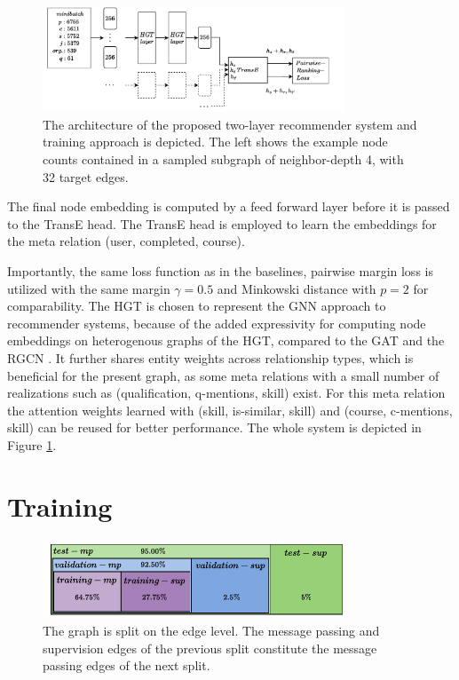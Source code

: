  \begin{figure}
    \centering
    \includegraphics[width=0.8\textwidth]{img/proposed.drawio (3).pdf}
    \caption[The architecture of the proposed recommender system]{The architecture of the proposed two-layer recommender system and training approach is depicted. The left shows the example node counts contained in a sampled subgraph of neighbor-depth 4, with 32 target edges.}
    \label{fig:proposed}
\end{figure}

The final node embedding is computed by a feed forward layer before it is passed to the TransE \parencite{bordes2013translating} head. The TransE head is employed to learn the embeddings for the meta relation (user, completed, course). 

Importantly, the same loss function as in the baselines, pairwise margin loss is utilized with the same margin $\gamma=0.5$ and Minkowski distance with $p=2$ for comparability. The HGT \parencite{hu2020heterogeneous} is chosen to represent the GNN approach to recommender systems, because of the added expressivity for computing node embeddings on heterogenous graphs of the HGT, compared to the GAT \parencite{velivckovic2017graph} and the RGCN \parencite{schlichtkrull2018modeling}. It further shares entity weights across relationship types, which is beneficial for the present graph, as some meta relations with a small number of realizations such as (qualification, q-mentions, skill) exist. For this meta relation the attention weights learned with (skill, is-similar, skill) and (course, c-mentions, skill) can be reused for better performance. The whole system is depicted in Figure \ref{fig:proposed}.

\section{Training}
 \begin{figure}
    \centering
    \includegraphics[width=0.8\textwidth]{img/datasetsplit.drawio (1).pdf}
    \caption[Edge-level graph split]{The graph is split on the edge level. The message passing and supervision edges of the previous split constitute the message passing edges of the next split. }
    \label{fig:split}
\end{figure}


